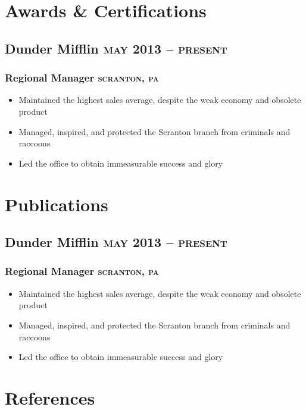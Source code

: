 \documentclass{article}
\newcommand{\rside}[1]{\hfill \normalfont\scshape\MakeLowercase{#1}}
\begin{document}
\section{\faTrophy\enspace Awards \& Certifications}
\subsection{Dunder Mifflin \rside{May 2013 -- Present}}
\subsubsection{Regional Manager \rside{Scranton, PA}}
\begin{itemize}
  \item Maintained the highest sales average, despite the weak economy and obsolete product
  \item Managed, inspired, and protected the Scranton branch from criminals and raccoons
  \item Led the office to obtain immeasurable success and glory
\end{itemize}

\section{\faBook \enspace Publications}
\subsection{Dunder Mifflin \rside{May 2013 -- Present}}
\subsubsection{Regional Manager \rside{Scranton, PA}}
\begin{itemize}
  \item Maintained the highest sales average, despite the weak economy and obsolete product
  \item Managed, inspired, and protected the Scranton branch from criminals and raccoons
  \item Led the office to obtain immeasurable success and glory
\end{itemize}

\section{\faUser \enspace References}
\end{document}
